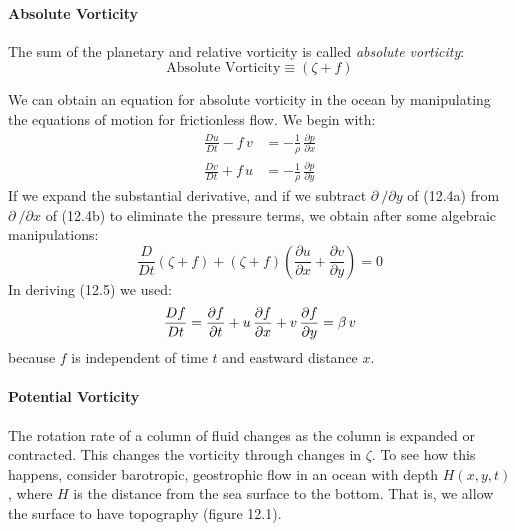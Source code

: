 \paragraph{Absolute Vorticity}
The sum of the planetary and relative vorticity is called
\textit{absolute vorticity}:
\begin{equation}
\boxed{ \text{Absolute Vorticity} \equiv (\zeta + f) }
\end{equation}

We can obtain an equation for absolute vorticity in the ocean by manipulating the equations of motion for frictionless flow. We begin with:
\begin{subequations}
\begin{align}
\frac{Du}{Dt} -f\,v &= -\frac{1}{\rho}\,\frac{\partial{p}}{\partial{x}} \\
\frac{Dv}{Dt} +f\,u &= -\frac{1}{\rho}\,\frac{\partial{p}}{\partial{y}}
\end{align}
\end{subequations}
If we expand the substantial derivative, and if we subtract
$\partial\:/\partial{y}$ of (12.4a) from $\partial\:/\partial{x}$ of (12.4b) to
eliminate the pressure terms, we obtain after some algebraic manipulations:
\begin{equation}
\boxed{ \frac{D}{Dt}\left(\zeta +f  \right) + \left(\zeta +f  \right)
\left(\frac{\partial{u}}{\partial{x}} +
\frac{\partial{v}}{\partial{y}} \right) = 0 }
\end{equation}
In deriving (12.5) we used:
\begin{equation}
\frac{Df}{Dt} = \frac{\partial{f}}{\partial{t}}
+u\,\frac{\partial{f}}{\partial{x}} +v\,\frac{\partial{f}}{\partial{y}} = \beta
\,v \notag
\end{equation}
because $f$ is independent of time $t$ and eastward distance $x$.

\paragraph{Potential Vorticity}
The rotation rate of a column of fluid changes as the column is expanded or contracted. This changes the vorticity through changes in $\zeta$. To see how this happens, consider barotropic, geostrophic flow in an ocean with depth $H(x, y, t)$, where $H$ is the distance from the sea surface to the bottom. That is, we allow the surface to have topography (figure 12.1).

